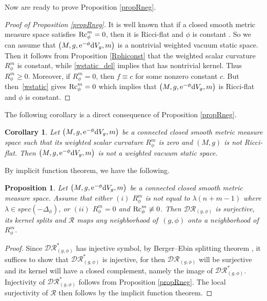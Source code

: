 \documentclass[10pt,a4paper]{amsart}
\numberwithin{equation}{section}
\newtheorem{Corollary}[Theorem]{Corollary}
\newtheorem{Proposition}[Theorem]{Proposition}
 { \theoremstyle{definition}
\newtheorem{Definition}[Theorem]{Definition}
\newtheorem{Note}[Theorem]{Note}
\newtheorem{Example}[Theorem]{Example}
\newtheorem{Remark}[Theorem]{Remark} }
\begin{document}
Now are ready to prove Proposition \ref{propRneg}.

\begin{proof}[Proof of Proposition \ref{propRneg}]
It is well known that if a closed smooth metric measure space satisfies ${\rm Rc}_\phi^m=0$, then it is Ricci-flat and $\phi$ is constant \cite{KimKim}. So we can assume that $\bigl(M,g,{\rm e}^{-\phi}{\rm d}V_g,m\bigr)$ is a nontrivial weighted vacuum static space.
Then it follows from Proposition \ref{Rphiconst} that
the weighted scalar curvature $R_\phi^m$ is constant, while \eqref{wstatic_del} implies that  has nontrivial kernel. Thus $R_\phi^m\geq0$. Moreover, if $R_\phi^m=0$, then $f\equiv c$ for some nonzero constant $c$. But then~\eqref{wstatic} gives ${\rm Rc}_\phi^m=0$ which implies that $\bigl(M,g,{\rm e}^{-\phi}{\rm d}V_g,m\bigr)$ is Ricci-flat and $\phi$ is constant.
\end{proof}

The following corollary is a direct consequence of Proposition \ref{propRneg}.

\begin{Corollary}\label{cor4.2}
Let $\bigl(M,g,{\rm e}^{-\phi}{\rm d}V_g,m\bigr)$ be a connected closed smooth metric measure space
such that its weighted scalar curvature $R_\phi^m$ is zero
and $(M,g)$ is not Ricci-flat.
Then $\bigl(M,g,{\rm e}^{-\phi}{\rm d}V_g,m\bigr)$
is not a weighted vacuum static space.
\end{Corollary}

By implicit function theorem, we have the following.
\begin{Proposition}\label{prop3.6}
 Let $\bigl(M,g,{\rm e}^{-\phi}{\rm d}V_g,m\bigr)$ be a connected closed smooth metric measure space. Assume that either $(i)$ $R_\phi^m$ is not equal to $\lambda(n+m-1)$ where $\lambda\in spec(-\Delta_\phi)$, or $(ii)$ $R_\phi^m=0$ and ${\rm Rc}_\phi^m\not\equiv 0$. Then $\mathcal{DR}_{(g,\phi)}$ is surjective, its kernel splits and $\mathcal{R}$ maps any neighborhood of~$(g,\phi)$ onto a neighborhood of $R_\phi^m$.
\end{Proposition}
\begin{proof}
 Since $\mathcal{DR}_{(g,\phi)}^*$ has injective symbol, by Berger--Ebin splitting theorem \cite{Berger&Ebin}, it suffices to show that $\mathcal{DR}_{(g,\phi)}^*$ is injective, for then $\mathcal{DR}_{(g,\phi)}$ will be surjective and its kernel will have a closed complement, namely  the image of $\mathcal{DR}_{(g,\phi)}^*$. Injectivity of $\mathcal{DR}_{(g,\phi)}^*$ follows from Proposition \ref{propRneg}. The local surjectivity of $\mathcal{R}$ then follows by the implicit function theorem.
\end{proof}
\end{document}
